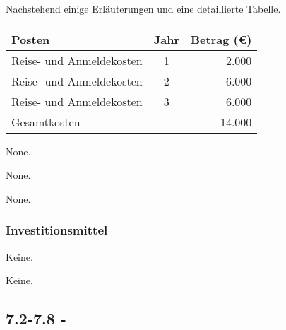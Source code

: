 \label{sec:travel}

Nachstehend einige Erläuterungen und eine detaillierte Tabelle.

\begin{tabular}{lcr}
     Posten & Jahr & Betrag (\euro)\\
     \toprule
     Reise- und Anmeldekosten & 1 & 2.000\\
     \midrule
     Reise- und Anmeldekosten & 2 & 6.000\\
     \midrule
     Reise- und Anmeldekosten & 3 & 6.000\\
     \midrule
     Gesamtkosten & & 14.000\\
     \bottomrule
\end{tabular}

None.

None.

None.



\subsubsection{Investitionsmittel}

Keine.

Keine.

\subsection*{7.2-7.8 -}



